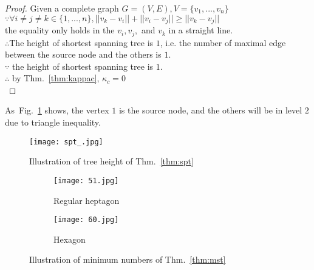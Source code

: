 \begin{proof}
Given a complete graph $G=(V, E), V=\{ v_1,...,v_n \}$ \\
$\because\forall i \ne j \ne k\in\{1,...,n\}, ||v_k-v_i||+||v_i-v_j||\ge||v_k-v_j||$ \\
the equality only holds in the $v_i,v_j,$ and $v_k$ in a straight line. \\
$\therefore$The height of shortest spanning tree is $1$, i.e. the number of maximal edge between the source node and the others is $1$.\\
$\because$ the height of shortest spanning tree is $1$.\\
$\therefore$ by Thm.~\ref{thm:kappac}, $\kappa_c  = 0$ \\

\end{proof}

As~Fig.~\ref{fig:spt_thm} shows, the vertex $1$ is the source node, and the others will be in level $2$ due to triangle inequality.

\begin{figure}[htbp]
  \centering
  \texttt{[image: spt\_.jpg]}
  \caption{Illustration of tree height of Thm.~\ref{thm:spt}}
  \label{fig:spt_thm}
\end{figure}

\begin{figure}[htbp]
 \begin{center}
\begin{subfigure}{.33\textwidth}
  \centering
  \texttt{[image: 51.jpg]}
  \caption{Regular heptagon}
\end{subfigure}
\begin{subfigure}{.36\textwidth}
  \centering
  \texttt{[image: 60.jpg]}
  \caption{Hexagon}
\end{subfigure}
\caption{Illustration of minimum numbers of Thm.~\ref{thm:mst}
}
\label{fig:mst_thm}
 \end{center}
 \end{figure}

